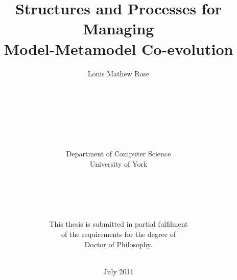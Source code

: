 \title{Structures and Processes for Managing \\ Model-Metamodel Co-evolution}
\author{Louis Mathew Rose \\ \\
\\ \\ \\ \\ \\ \\
Department of Computer Science \\ 
University of York
\\ \\ \\ \\ \\ \\
This thesis is submitted in partial fulfilment \\
of the requirements for the degree of \\
Doctor of Philosophy. \\ \\}
\date{July 2011}